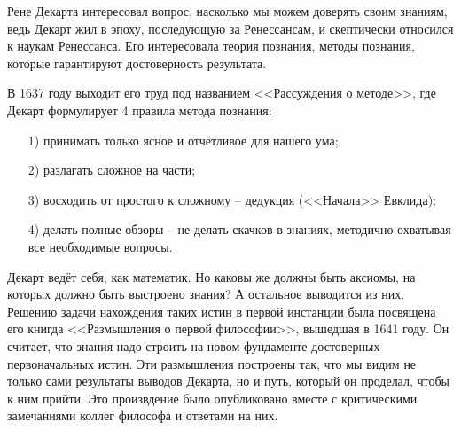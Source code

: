 \documentclass[a4paper, 12pt]{book} %
\begin{document}
Рене Декарта интересовал вопрос, насколько мы можем доверять своим знаниям, ведь Декарт жил в эпоху, последующую за Ренессансам, и скептически относился к наукам Ренессанса. Его интересовала теория познания, методы познания, которые гарантируют достоверность результата. 

В 1637 году выходит его труд под названием <<Рассуждения о методе>>, где Декарт формулирует 4 правила метода познания:
\begin{itemize}
\item[1)] принимать только ясное и отчётливое для нашего ума;
\item[2)] разлагать сложное на части;
\item[3)] восходить от простого к сложному -- дедукция (<<Начала>> Евклида);
\item[4)] делать полные обзоры -- не делать скачков в знаниях, методично охватывая все необходимые вопросы.  
\end{itemize}	

Декарт ведёт себя, как математик. Но каковы же должны быть аксиомы, на которых должно быть выстроено знания?	А остальное выводится из них. Решению задачи нахождения таких истин в первой инстанции была посвящена его книгда <<Размышления о первой философии>>, вышедшая в 1641 году. Он считает, что знания надо строить на новом фундаменте достоверных первоначальных истин. Эти размышления построены так, что мы видим не только сами результаты выводов Декарта, но и путь, который он проделал, чтобы к ним прийти. Это произвдение было опубликовано вместе с критическими замечаниями коллег философа и ответами на них.
\end{document}
